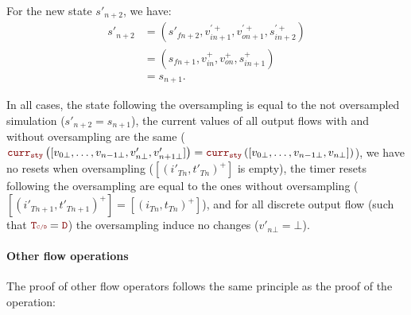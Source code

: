 \begin{skippableproof}
\begin{itemize}
              For the new state $s'_{n+2}$, we have:
              \begin{equation*}
                  \begin{split}
                      s'_{n+2} & = (s'_{fn+2}, v_{in+1}^{\prime+}, v_{on+1}^{\prime+}, s_{in+2}^{\prime+}) \\
                               & = (s_{fn+1}, v_{in}^+, v_{on}^+, s_{in+1}^+)                              \\
                               & = s_{n+1}.
                  \end{split}
              \end{equation*}
    \end{itemize}
    In all cases, the state following the oversampling is equal to the not oversampled simulation
    ($s'_{n+2} = s_{n+1}$), the current values of all output flows with and without oversampling are
    the same ($\CurrVal{sty}{[v_{0\bot}, \dots, v_{n-1\bot}, v'_{n\bot}, v'_{n+1\bot}]} =
        \CurrVal{sty}{[v_{0\bot}, \dots, v_{n-1\bot}, v_{n\bot}]}$), we have no resets when oversampling
    ($[(i'_{Tn}, t'_{Tn})^+]$ is empty), the timer resets following the oversampling are equal to
    the ones without oversampling ($[(i'_{Tn+1}, t'_{Tn+1})^+] = [(i_{Tn}, t_{Tn})^+]$), and for all
    discrete output flow (\ie such that $\rType = \dType$) the oversampling induce no changes
    ($v'_{n\bot} = \bot$).

    \paragraph{Other flow operations}

    The proof of other flow operators follows the same principle as the proof of the
     operation:


\end{skippableproof}
